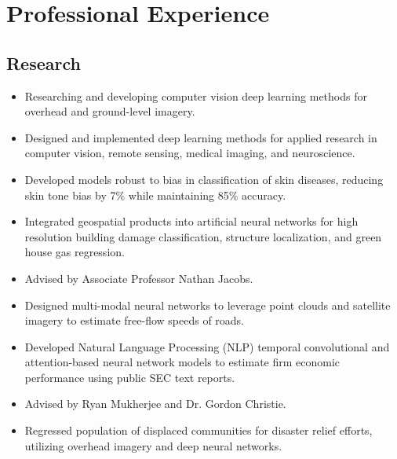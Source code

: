 \documentclass[11pt,a4paper,sans]{moderncv} %
\begin{document}
\section{Professional Experience}
\subsection{Research}
{
\begin{itemize} 
	\item Researching and developing computer vision deep learning methods for overhead and ground-level imagery.  
\end{itemize}
}
{
\begin{itemize} 
	\item Designed and implemented deep learning methods for applied research in computer vision, remote sensing, medical imaging, and neuroscience.
	\item Developed models robust to bias in classification of skin diseases, reducing skin tone bias by 7\% while maintaining 85\% accuracy.
	\item Integrated geospatial products into artificial neural networks for high resolution building damage classification, structure localization, and green house gas regression.  
\end{itemize}
}
{
\begin{itemize} 
	\item Advised by Associate Professor Nathan Jacobs.
	\item Designed multi-modal neural networks to leverage point clouds and satellite imagery to estimate free-flow speeds of roads.
	\item Developed Natural Language Processing (NLP) temporal convolutional and attention-based neural network models to estimate firm economic performance using public SEC text reports. 
\end{itemize}
}
{
\begin{itemize} 
	\item Advised by Ryan Mukherjee and Dr. Gordon Christie.
	\item Regressed population of displaced communities for disaster relief efforts, utilizing overhead imagery and deep neural networks.
\end{itemize}
}
\end{document}
